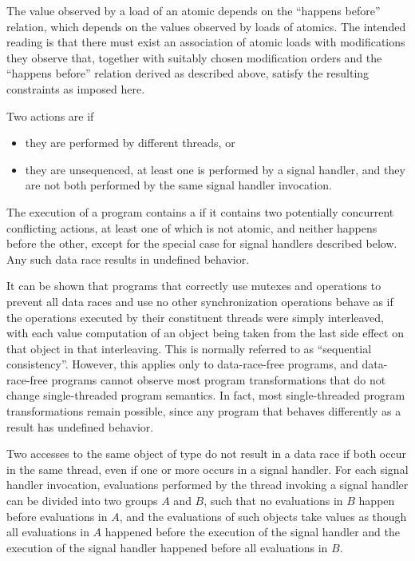 \pnum
\begin{note}
The value observed by a load of an atomic depends on the ``happens
before'' relation, which depends on the values observed by loads of atomics.
The intended reading is that there must exist an
association of atomic loads with modifications they observe that, together with
suitably chosen modification orders and the ``happens before'' relation derived
as described above, satisfy the resulting constraints as imposed here.
\end{note}

\pnum
Two actions are  if
\begin{itemize}
\item they are performed by different threads, or
\item they are unsequenced, at least one is performed by a signal handler, and
they are not both performed by the same signal handler invocation.
\end{itemize}
The execution of a program contains a  if it contains two
potentially concurrent conflicting actions, at least one of which is not atomic,
and neither happens before the other,
except for the special case for signal handlers described below.
Any such data race results in undefined
behavior.
\begin{note}
It can be shown that programs that correctly use mutexes
and  operations to prevent all data races and use no
other synchronization operations behave as if the operations executed by their
constituent threads were simply interleaved, with each
%
value computation of an
object being taken from the last
%
side effect on that object in that
interleaving. This is normally referred to as ``sequential consistency''.
However, this applies only to data-race-free programs, and data-race-free
programs cannot observe most program transformations that do not change
single-threaded program semantics. In fact, most single-threaded program
transformations remain possible, since any program that behaves
differently as a result has undefined behavior.
\end{note}

\pnum
Two accesses to the same object of type  do not
result in a data race if both occur in the same thread, even if one or more
occurs in a signal handler. For each signal handler invocation, evaluations
performed by the thread invoking a signal handler can be divided into two
groups $A$ and $B$, such that no evaluations in
$B$ happen before evaluations in $A$, and the
evaluations of such  objects take values as though
all evaluations in $A$ happened before the execution of the signal
handler and the execution of the signal handler happened before all evaluations
in $B$.

